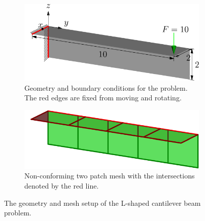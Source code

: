 \documentclass[preprint,12pt]{elsarticle}
\theoremstyle{remark}
\begin{document}
\begin{figure}[!hbt]
    \centering
    \captionsetup[subfigure]{font = footnotesize}
    \begin{subfigure}[b]{.48\textwidth}
        \centering
        \includegraphics[width = \textwidth]{L-beam-config}
        \caption{Geometry and boundary conditions for the problem. The red edges are fixed from moving and rotating.}\label{fig:L-beam}
    \end{subfigure}
    \begin{subfigure}[b]{.48\textwidth}
        \centering
        \includegraphics[width = \textwidth]{L-beam-decompose}
        \caption{Non-conforming two patch mesh with the intersections denoted by the red line.}\label{fig:L-beam-decompose}
    \end{subfigure}
	\caption{The geometry and mesh setup of the L-shaped cantilever beam problem.}
\end{figure}
\end{document}

